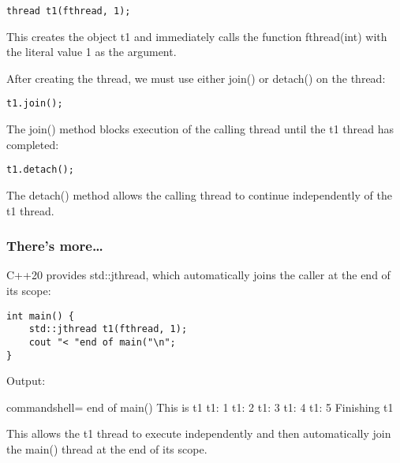 \begin{lstlisting}[style=styleCXX]
thread t1(fthread, 1);
\end{lstlisting}

This creates the object t1 and immediately calls the function fthread(int) with the literal value 1 as the argument.

After creating the thread, we must use either join() or detach() on the thread:

\begin{lstlisting}[style=styleCXX]
t1.join();
\end{lstlisting}

The join() method blocks execution of the calling thread until the t1 thread has completed:

\begin{lstlisting}[style=styleCXX]
t1.detach();
\end{lstlisting}

The detach() method allows the calling thread to continue independently of the t1 thread.

\subsubsection{There's more…}

C++20 provides std::jthread, which automatically joins the caller at the end of its scope:

\begin{lstlisting}[style=styleCXX]
int main() {
	std::jthread t1(fthread, 1);
	cout "< "end of main("\n";
}
\end{lstlisting}

Output:

\begin{tcblisting}{commandshell={}}
end of main()
This is t1
t1: 1
t1: 2
t1: 3
t1: 4
t1: 5
Finishing t1
\end{tcblisting}

This allows the t1 thread to execute independently and then automatically join the main() thread at the end of its scope.











